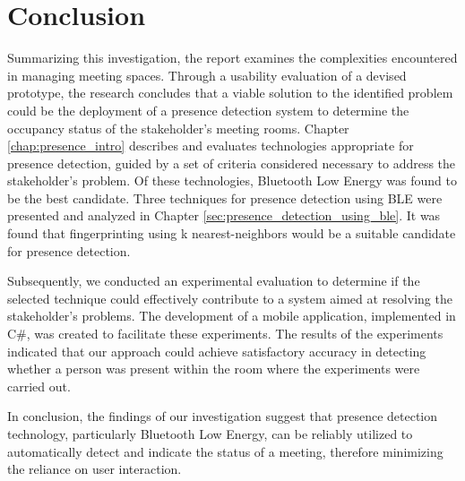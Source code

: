 \chapter{Conclusion}
Summarizing this investigation, the report examines the complexities encountered in managing meeting spaces. 
Through a usability evaluation of a devised prototype, the research concludes that a viable solution to the identified problem could be the deployment of a presence detection system to determine the occupancy status of the stakeholder's meeting rooms.
Chapter \ref{chap:presence_intro} describes and evaluates technologies appropriate for presence detection, guided by a set of criteria considered necessary to address the stakeholder's problem. 
Of these technologies, Bluetooth Low Energy was found to be the best candidate. 
Three techniques for presence detection using BLE were presented and analyzed in Chapter \ref{sec:presence_detection_using_ble}. 
It was found that fingerprinting using k nearest-neighbors would be a suitable candidate for presence detection.

Subsequently, we conducted an experimental evaluation to determine if the selected technique could effectively contribute to a system aimed at resolving the stakeholder's problems. 
The development of a mobile application, implemented in C\#, was created to facilitate these experiments. 
The results of the experiments indicated that our approach could achieve satisfactory accuracy in detecting whether a person was present within the room where the experiments were carried out.

In conclusion, the findings of our investigation suggest that presence detection technology, particularly Bluetooth Low Energy, can be reliably utilized to automatically detect and indicate the status of a meeting, therefore minimizing the reliance on user interaction.
